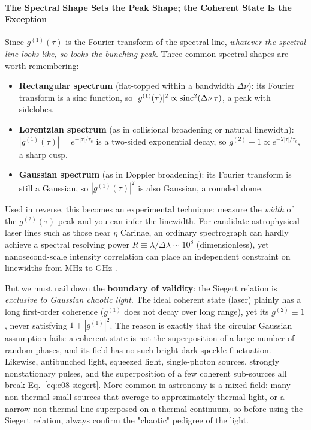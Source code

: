 \paragraph{The Spectral Shape Sets the Peak Shape; the Coherent State Is the Exception}
\label{sec:e08-shapes}

Since \(g^{(1)}(\tau)\) is the Fourier transform of the spectral line, \emph{whatever the spectral line looks like, so looks the bunching peak}. Three common spectral shapes are worth remembering:

\begin{itemize}
  \item \textbf{Rectangular spectrum} (flat-topped within a bandwidth \(\Delta\nu\)): its Fourier transform is a sinc function, so \(|g^{(1)}(\tau)|^2\propto{\rm sinc}^2(\Delta\nu\,\tau)\), a peak with sidelobes.
  \item \textbf{Lorentzian spectrum} (as in collisional broadening or natural linewidth): \(|g^{(1)}(\tau)|=e^{-|\tau|/\tau_c}\) is a two-sided exponential decay, so \(g^{(2)}-1\propto e^{-2|\tau|/\tau_c}\), a sharp cusp.
  \item \textbf{Gaussian spectrum} (as in Doppler broadening): its Fourier transform is still a Gaussian, so \(|g^{(1)}(\tau)|^2\) is also Gaussian, a rounded dome.
\end{itemize}

Used in reverse, this becomes an experimental technique: measure the \emph{width} of the \(g^{(2)}(\tau)\) peak and you can infer the linewidth. For candidate astrophysical laser lines such as those near \(\eta\) Carinae, an ordinary spectrograph can hardly achieve a spectral resolving power \(R\equiv\lambda/\Delta\lambda\sim10^8\) (dimensionless), yet nanosecond-scale intensity correlation can place an independent constraint on linewidths from MHz to GHz \citep{2005NewA...10..361J,2008AIPC..984..216D,2014ApJ...789L..10T}.

But we must nail down the \textbf{boundary of validity}: the Siegert relation is \emph{exclusive to Gaussian chaotic light}. The ideal coherent state (laser) plainly has a long first-order coherence (\(g^{(1)}\) does not decay over long range), yet its \(g^{(2)}\equiv1\), never satisfying \(1+|g^{(1)}|^2\). The reason is exactly that the circular Gaussian assumption fails: a coherent state is not the superposition of a large number of random phases, and its field has no such bright-dark speckle fluctuation. Likewise, antibunched light, squeezed light, single-photon sources, strongly nonstationary pulses, and the superposition of a few coherent sub-sources all break Eq.~\eqref{eq:e08-siegert}. More common in astronomy is a mixed field: many non-thermal small sources that average to approximately thermal light, or a narrow non-thermal line superposed on a thermal continuum, so before using the Siegert relation, always confirm the "chaotic" pedigree of the light.

